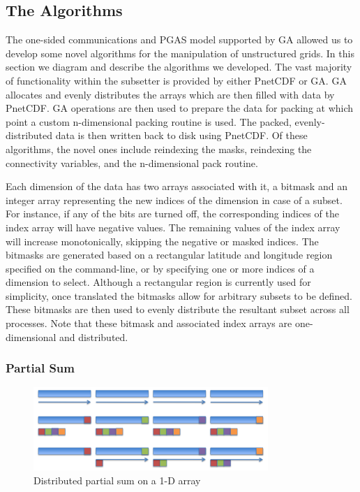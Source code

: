 \subsection{The Algorithms}

The one-sided communications and PGAS model supported by GA allowed us to
develop some novel algorithms for the manipulation of unstructured grids.  In
this section we diagram and describe the algorithms we developed.  The vast
majority of functionality within the subsetter is provided by either PnetCDF
or GA.  GA allocates and evenly distributes the arrays which are then filled
with data by PnetCDF.  GA operations are then used to prepare the data for
packing at which point a custom n-dimensional packing routine is used.  The
packed, evenly-distributed data is then written back to disk using PnetCDF.
Of these algorithms, the novel ones include reindexing the masks, reindexing
the connectivity variables, and the n-dimensional pack routine.

Each dimension of the data has two arrays associated with it, a bitmask and an
integer array representing the new indices of the dimension in case of a
subset.  For instance, if any of the bits are turned off, the corresponding
indices of the index array will have negative values.  The remaining values of
the index array will increase monotonically, skipping the negative or masked
indices.  The bitmasks are generated based on a rectangular latitude and
longitude region specified on the command-line, or by specifying one or more
indices of a dimension to select.  Although a rectangular region is currently
used for simplicity, once translated the bitmasks allow for arbitrary subsets
to be defined.  These bitmasks are then used to evenly distribute the
resultant subset across all processes.  Note that these bitmask and associated
index arrays are one-dimensional and distributed.

\subsubsection{Partial Sum}

\begin{figure}[!t]
\center
\includegraphics[width=3.5in]{images/partialsum}
\caption{Distributed partial sum on a 1-D array}
\label{fig:partialsum}
\end{figure}

